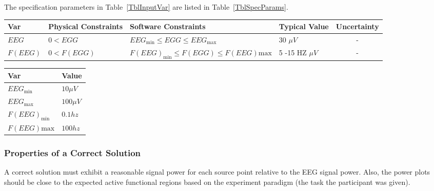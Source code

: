 \documentclass[12pt]{article}
\begin{document}
The specification parameters in Table~\ref{TblInputVar} are listed in
Table~\ref{TblSpecParams}.

\begin{table}[!h]
  \caption{Input Variables} \label{TblInputVar}
  \renewcommand{\arraystretch}{1.2}
\noindent \begin{longtable*}{l l l l c} 
  \toprule
  \textbf{Var} & \textbf{Physical Constraints} & \textbf{Software Constraints} &
                             \textbf{Typical Value} & \textbf{Uncertainty}\\
  \midrule 
  $EEG$ & $0<EGG$ & $EEG_\text{min} \leq EGG \leq EEG_\text{max}$ & 30 $\mu V$ & -  \\
  $F(EEG)$ & $0<F(EGG)$ & $F(EEG)_\text{min} \leq F(EGG) \leq F(EEG)\text{max}$ & 5 -15 HZ $\mu V$ & -  \\
  \bottomrule
\end{longtable*}
\end{table}


\begin{table}[!h]
\caption{Specification Parameter Values} \label{TblSpecParams}
\renewcommand{\arraystretch}{1.2}
\noindent \begin{longtable*}{l l} 
  \toprule
  \textbf{Var} & \textbf{Value} \\
  \midrule 
  $EEG_\text{min}$ & $10 \mu V$\\
   $EEG_\text{max}$ & $100 \mu V$\\
   $F(EEG)_\text{min}$ & $0.1 hz $\\
   $F(EEG)\text{max}$ & $100 hz $\\
  \bottomrule
\end{longtable*}
\end{table}

\subsubsection{Properties of a Correct Solution} \label{sec_CorrectSolution}

\noindent
A correct solution must exhibit a reasonable signal power for each source point relative to the EEG signal power. Also, the power plots should be close to the expected active functional regions based on the experiment paradigm (the task the participant was given).
\end{document}
